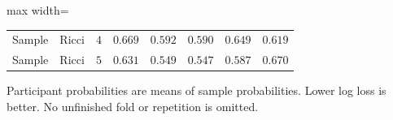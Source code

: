 \begin{table}[!htbp]
\begin{adjustbox}{max width=\linewidth}
\begin{tabular}{llrrrrrr}
Sample & Ricci & $4$ & $0.669$ & $0.592$ & $0.590$ & $0.649$ & $0.619$ \\
Sample & Ricci & $5$ & $0.631$ & $0.549$ & $0.547$ & $0.587$ & $0.670$ \\
\bottomrule
\end{tabular}
\end{adjustbox}
\par\smallskip\begin{minipage}{0.98\linewidth}\footnotesize Participant probabilities are means of sample probabilities. Lower log loss is better. No unfinished fold or repetition is omitted.
\end{minipage}
\endgroup
\end{table}
